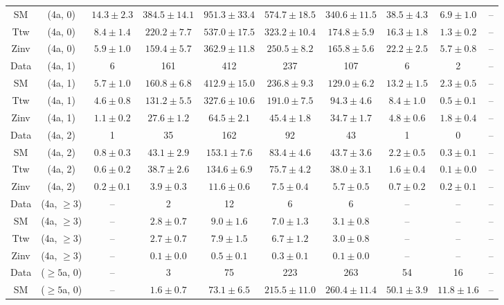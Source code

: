 \begin{table}[h!]
{\begin{tabular}{cccccccccc}
	SM & (4a, 0) & $14.3\pm 2.3$ & $384.5\pm 14.1$ & $951.3\pm 33.4$ & $574.7\pm 18.5$ & $340.6\pm 11.5$ & $38.5\pm 4.3$ & $6.9\pm 1.0$ & -- \\[0.5ex] 
	Ttw & (4a, 0) & $8.4\pm 1.4$ & $220.2\pm 7.7$ & $537.0\pm 17.5$ & $323.2\pm 10.4$ & $174.8\pm 5.9$ & $16.3\pm 1.8$ & $1.3\pm 0.2$ & -- \\[0.5ex] 
	Zinv & (4a, 0) & $5.9\pm 1.0$ & $159.4\pm 5.7$ & $362.9\pm 11.8$ & $250.5\pm 8.2$ & $165.8\pm 5.6$ & $22.2\pm 2.5$ & $5.7\pm 0.8$ & -- \\[0.5ex] 
	Data & (4a, 1) & 6 & 161 & 412 & 237 & 107 & 6 & 2 & -- \\[0.5ex] 
	SM & (4a, 1) & $5.7\pm 1.0$ & $160.8\pm 6.8$ & $412.9\pm 15.0$ & $236.8\pm 9.3$ & $129.0\pm 6.2$ & $13.2\pm 1.5$ & $2.3\pm 0.5$ & -- \\[0.5ex] 
	Ttw & (4a, 1) & $4.6\pm 0.8$ & $131.2\pm 5.5$ & $327.6\pm 10.6$ & $191.0\pm 7.5$ & $94.3\pm 4.6$ & $8.4\pm 1.0$ & $0.5\pm 0.1$ & -- \\[0.5ex] 
	Zinv & (4a, 1) & $1.1\pm 0.2$ & $27.6\pm 1.2$ & $64.5\pm 2.1$ & $45.4\pm 1.8$ & $34.7\pm 1.7$ & $4.8\pm 0.6$ & $1.8\pm 0.4$ & -- \\[0.5ex] 
	Data & (4a, 2) & 1 & 35 & 162 & 92 & 43 & 1 & 0 & -- \\[0.5ex] 
	SM & (4a, 2) & $0.8\pm 0.3$ & $43.1\pm 2.9$ & $153.1\pm 7.6$ & $83.4\pm 4.6$ & $43.7\pm 3.6$ & $2.2\pm 0.5$ & $0.3\pm 0.1$ & -- \\[0.5ex] 
	Ttw & (4a, 2) & $0.6\pm 0.2$ & $38.7\pm 2.6$ & $134.6\pm 6.9$ & $75.7\pm 4.2$ & $38.0\pm 3.1$ & $1.6\pm 0.4$ & $0.1\pm 0.0$ & -- \\[0.5ex] 
	Zinv & (4a, 2) & $0.2\pm 0.1$ & $3.9\pm 0.3$ & $11.6\pm 0.6$ & $7.5\pm 0.4$ & $5.7\pm 0.5$ & $0.7\pm 0.2$ & $0.2\pm 0.1$ & -- \\[0.5ex] 
	Data & (4a, $\ge3$) & -- & 2 & 12 & 6 & 6 & -- & -- & -- \\[0.5ex] 
	SM & (4a, $\ge3$) & -- & $2.8\pm 0.7$ & $9.0\pm 1.6$ & $7.0\pm 1.3$ & $3.1\pm 0.8$ & -- & -- & -- \\[0.5ex] 
	Ttw & (4a, $\ge3$) & -- & $2.7\pm 0.7$ & $7.9\pm 1.5$ & $6.7\pm 1.2$ & $3.0\pm 0.8$ & -- & -- & -- \\[0.5ex] 
	Zinv & (4a, $\ge3$) & -- & $0.1\pm 0.0$ & $0.5\pm 0.1$ & $0.3\pm 0.1$ & $0.1\pm 0.0$ & -- & -- & -- \\[0.5ex] 
	Data & ($\ge5$a, 0) & -- & 3 & 75 & 223 & 263 & 54 & 16 & -- \\[0.5ex] 
	SM & ($\ge5$a, 0) & -- & $1.6\pm 0.7$ & $73.1\pm 6.5$ & $215.5\pm 11.0$ & $260.4\pm 11.4$ & $50.1\pm 3.9$ & $11.8\pm 1.6$ & -- \\[0.5ex] 

\end{tabular}}
\end{table}
